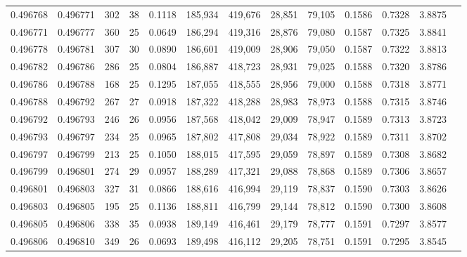 \begin{tabular}{rrrrrrrrrrrrr}
0.496768 & 0.496771 & 302 &  38 &                                     0.1118 & 185,934 & 419,676 &  28,851 &  79,105 & 0.1586 & 0.7328 & 3.8875 \\
0.496771 & 0.496777 & 360 &  25 &                                     0.0649 & 186,294 & 419,316 &  28,876 &  79,080 & 0.1587 & 0.7325 & 3.8841 \\
0.496778 & 0.496781 & 307 &  30 &                                     0.0890 & 186,601 & 419,009 &  28,906 &  79,050 & 0.1587 & 0.7322 & 3.8813 \\
0.496782 & 0.496786 & 286 &  25 &                                     0.0804 & 186,887 & 418,723 &  28,931 &  79,025 & 0.1588 & 0.7320 & 3.8786 \\
0.496786 & 0.496788 & 168 &  25 &                                     0.1295 & 187,055 & 418,555 &  28,956 &  79,000 & 0.1588 & 0.7318 & 3.8771 \\
0.496788 & 0.496792 & 267 &  27 &                                     0.0918 & 187,322 & 418,288 &  28,983 &  78,973 & 0.1588 & 0.7315 & 3.8746 \\
0.496792 & 0.496793 & 246 &  26 &                                     0.0956 & 187,568 & 418,042 &  29,009 &  78,947 & 0.1589 & 0.7313 & 3.8723 \\
0.496793 & 0.496797 & 234 &  25 &                                     0.0965 & 187,802 & 417,808 &  29,034 &  78,922 & 0.1589 & 0.7311 & 3.8702 \\
0.496797 & 0.496799 & 213 &  25 &                                     0.1050 & 188,015 & 417,595 &  29,059 &  78,897 & 0.1589 & 0.7308 & 3.8682 \\
0.496799 & 0.496801 & 274 &  29 &                                     0.0957 & 188,289 & 417,321 &  29,088 &  78,868 & 0.1589 & 0.7306 & 3.8657 \\
0.496801 & 0.496803 & 327 &  31 &                                     0.0866 & 188,616 & 416,994 &  29,119 &  78,837 & 0.1590 & 0.7303 & 3.8626 \\
0.496803 & 0.496805 & 195 &  25 &                                     0.1136 & 188,811 & 416,799 &  29,144 &  78,812 & 0.1590 & 0.7300 & 3.8608 \\
0.496805 & 0.496806 & 338 &  35 &                                     0.0938 & 189,149 & 416,461 &  29,179 &  78,777 & 0.1591 & 0.7297 & 3.8577 \\
0.496806 & 0.496810 & 349 &  26 &                                     0.0693 & 189,498 & 416,112 &  29,205 &  78,751 & 0.1591 & 0.7295 & 3.8545 \\

\end{tabular}
